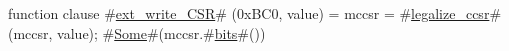 function clause #\hyperref[sailRISCVzextzywritezyCSR]{ext\_write\_CSR}# (0xBC0, value) = { mccsr = #\hyperref[sailRISCVzlegalizzezyccsr]{legalize\_ccsr}#(mccsr, value); #\hyperref[sailRISCVzSome]{Some}#(mccsr.#\hyperref[sailRISCVzbits]{bits}#()) }
